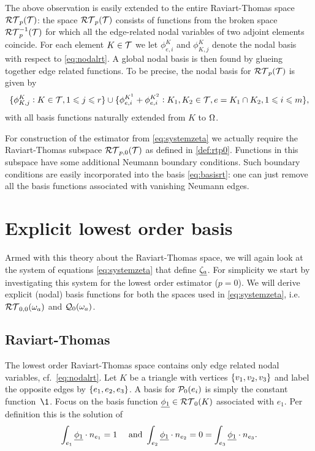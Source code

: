 \documentclass[thesis.tex]{subfiles}
\begin{document}
The above observation is easily extended to the entire Raviart-Thomas space $\RT_p( \T)$:
the space $\RT_p(\T)$ consists of functions from the broken space $\RT_p^{-1}( \T)$ for which all the edge-related
nodal variables of two adjoint elements coincide. For each element $K \in  \T$ we let $\phi^K_{e,i}$ and $\phi^K_{K,j}$
denote the nodal basis with respect to \eqref{eq:nodalrt}. A global nodal basis is then found by
glueing together edge related functions. To be precise, the nodal basis for $\RT_p( \T)$ is given by
\begin{equation}
  \label{eq:basisrt}
  \{\phi^K_{K, j} : K \in  \T, 1 \leq j \leq r\} \cup \{\phi^{K^1}_{e,i} + \phi^{K^2}_{e,i}: K_1, K_2 \in  \T, e = K_1 \cap K_2, 1 \leq i \leq m\},
\end{equation}
with all basis functions naturally extended from $K$ to $\O$.

For construction of the estimator from \eqref{eq:systemzeta} we actually require the Raviart-Thomas subspace 
$\RT_{p,0}(\T)$ as defined in \eqref{def:rtp0}.
Functions in this subspace have some additional Neumann boundary conditions.
Such boundary conditions are easily incorporated into the basis \eqref{eq:basisrt}:
one can just remove all the basis functions associated with vanishing Neumann edges.

\section{Explicit lowest order basis}
Armed with this theory about the Raviart-Thomas space, we will again look at the
system of equations \eqref{eq:systemzeta} that define $\vzeta$. For simplicity we start by
investigating this system for the lowest order estimator ($p=0$).  We will derive
explicit (nodal) basis functions for both the spaces used in \eqref{eq:systemzeta}, i.e.~$\RT_{0,0}(\w_a)$ and $\QQ_0(\w_a)$.

\subsection{Raviart-Thomas}
The lowest order Raviart-Thomas space contains only edge related nodal variables, cf.~\eqref{eq:nodalrt}.
Let $K$ be a triangle with vertices $\set{v_1, v_2, v_3}$ and label the opposite edges by $\set{e_1, e_2, e_3}$.
A basis for $\P_0(e_i)$ is simply the constant function~$\1$.
Focus on the basis function $\v{\phi_1} \in \RT_0(K)$ associated with $e_1$.
Per definition this is the solution of
\begin{equation}
  \label{eq:solphi1}
  \int_{e_1} \v{\phi_1}\cdot n_{e_1} = 1 \quad \text{ and } \int_{e_2} \v{\phi_1} \cdot n_{e_2} = 0 = \int_{e_3} \v{\phi_1} \cdot n_{e_3}.
\end{equation}
\end{document}
